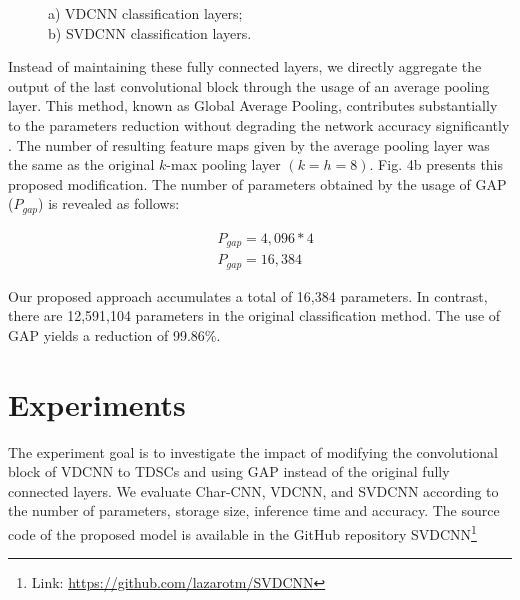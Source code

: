 \documentclass[conference]{IEEEtran}
\begin{document}
\begin{figure}[htbp]
\begin{minipage}{.5\linewidth}
\centering
{}
\end{minipage}\begin{minipage}{.5\linewidth}
\end{minipage}
\caption{a) VDCNN classification layers;\\b) SVDCNN classification layers.}
\label{fig:main}
\end{figure}

\newpage

Instead of maintaining these fully connected layers, we directly aggregate the output of the last convolutional block through the usage of an average pooling layer. This method, known as Global Average Pooling, contributes substantially to the parameters reduction without degrading the network accuracy significantly \cite{lin2013network}. The number of resulting feature maps given by the average pooling layer was the same as the original $k$-max pooling layer $(k = h = 8)$.  Fig. 4b presents this proposed modification. The number of parameters obtained by the usage of GAP ($P_{gap}$) is revealed as follows:

\begin{equation}
\begin{aligned}
     & P_{gap} = 4,096 \ast 4 \\
    & P_{gap} = 16,384
\end{aligned}
\end{equation}

Our proposed approach accumulates a total of 16,384 parameters. In contrast, there are 12,591,104 parameters in the original classification method. The use of GAP yields a reduction of 99.86\%.
 
\section{Experiments}

The experiment goal is to investigate the impact of modifying the convolutional block of VDCNN to TDSCs and using GAP instead of the original fully connected layers. We evaluate Char-CNN, VDCNN, and SVDCNN according to the number of parameters, storage size, inference time and accuracy. The source code of the proposed model is available in the GitHub repository SVDCNN\footnote[1]{Link: \url{https://github.com/lazarotm/SVDCNN}}
\end{document}
